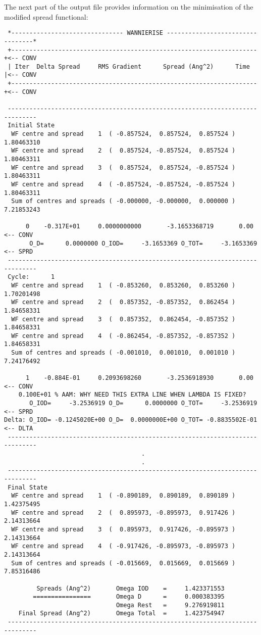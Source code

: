 The next part of the output file provides information on the minimisation of the 
modified spread functional:
\begin{verbatim}
 *------------------------------- WANNIERISE ---------------------------------*
 +--------------------------------------------------------------------+<-- CONV
 | Iter  Delta Spread     RMS Gradient      Spread (Ang^2)      Time  |<-- CONV
 +--------------------------------------------------------------------+<-- CONV

 ------------------------------------------------------------------------------
 Initial State
  WF centre and spread    1  ( -0.857524,  0.857524,  0.857524 )     1.80463310
  WF centre and spread    2  (  0.857524, -0.857524,  0.857524 )     1.80463311
  WF centre and spread    3  (  0.857524,  0.857524, -0.857524 )     1.80463311
  WF centre and spread    4  ( -0.857524, -0.857524, -0.857524 )     1.80463311
  Sum of centres and spreads ( -0.000000, -0.000000,  0.000000 )     7.21853243

      0    -0.317E+01     0.0000000000       -3.1653368719       0.00  <-- CONV
       O_D=      0.0000000 O_IOD=     -3.1653369 O_TOT=     -3.1653369 <-- SPRD
 ------------------------------------------------------------------------------
 Cycle:      1
  WF centre and spread    1  ( -0.853260,  0.853260,  0.853260 )     1.70201498
  WF centre and spread    2  (  0.857352, -0.857352,  0.862454 )     1.84658331
  WF centre and spread    3  (  0.857352,  0.862454, -0.857352 )     1.84658331
  WF centre and spread    4  ( -0.862454, -0.857352, -0.857352 )     1.84658331
  Sum of centres and spreads ( -0.001010,  0.001010,  0.001010 )     7.24176492

      1    -0.884E-01     0.2093698260       -3.2536918930       0.00  <-- CONV
    0.100E+01 % AAM: WHY NEED THIS EXTRA LINE WHEN LAMBDA IS FIXED?
       O_IOD=     -3.2536919 O_D=      0.0000000 O_TOT=     -3.2536919 <-- SPRD
Delta: O_IOD= -0.1245020E+00 O_D=  0.0000000E+00 O_TOT= -0.8835502E-01 <-- DLTA
 ------------------------------------------------------------------------------
                                      .
                                      .
 ------------------------------------------------------------------------------
 Final State
  WF centre and spread    1  ( -0.890189,  0.890189,  0.890189 )     1.42375495
  WF centre and spread    2  (  0.895973, -0.895973,  0.917426 )     2.14313664
  WF centre and spread    3  (  0.895973,  0.917426, -0.895973 )     2.14313664
  WF centre and spread    4  ( -0.917426, -0.895973, -0.895973 )     2.14313664
  Sum of centres and spreads ( -0.015669,  0.015669,  0.015669 )     7.85316486
 
         Spreads (Ang^2)       Omega IOD    =     1.423371553
        ================       Omega D      =     0.000383395
                               Omega Rest   =     9.276919811
    Final Spread (Ang^2)       Omega Total  =     1.423754947
 ------------------------------------------------------------------------------

\end{verbatim}
 
